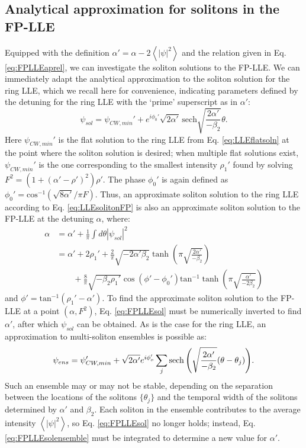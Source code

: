 \subsection{Analytical approximation for solitons in the FP-LLE}
Equipped with the definition $\alpha'=\alpha-2\left<|\psi|^2\right>$ and the relation given in Eq. \ref{eq:FPLLEaprel}, we can investigate the soliton solutions to the FP-LLE. We can immediately adapt the analytical approximation to the soliton solution for the ring LLE, which we recall here for convenience, indicating parameters defined by the detuning for the ring LLE with the `prime' superscript as in $\alpha'$:
\begin{equation}
\psi_{sol}=\psi_{CW,min}'+e^{i\phi_0'}\sqrt{2\alpha'}\,\mathrm{sech}\sqrt{\frac{2\alpha'}{-\beta_2}}\theta. \label{eq:LLEsolitonFP}
\end{equation}
Here $\psi_{CW,min}'$ is the flat solution to the ring LLE from Eq. \ref{eq:LLEflatsoln} at the point where the soliton solution is desired; when multiple flat solutions exist, $\psi_{CW,min}'$ is the one corresponding to the smallest intensity $\rho_1'$ found by solving $F^2=(1+(\alpha'-\rho')^2)\rho'$. The phase $\phi_0'$ is again defined as $\phi_0'=\mathrm{cos}^{-1}(\sqrt{8\alpha'}/\pi F)$. Thus, an approximate soliton solution to the ring LLE according to Eq. \ref{eq:LLEsolitonFP} is also an approximate soliton solution to the FP-LLE at the detuning $\alpha$, where:
\begin{align}
\alpha&=\alpha'+\frac{1}{\pi}\int d\theta |\psi_{sol}|^2\\
&=\alpha'+2\rho_1'+\frac{2}{\pi}\sqrt{-2\alpha'\beta_2}\tanh{\left(\pi\sqrt{\frac{2\alpha'}{-\beta_2}}\right)}\label{eq:FPLLEsol}\\
&\quad\quad +\frac{8}{\pi}\sqrt{-\beta_2 \rho_1'}\cos(\phi'-\phi_0')\mathrm{tan}^{-1}\tanh{\left(\pi\sqrt{\frac{\alpha'}{-2\beta_2}}\right)}\nonumber
\end{align}
and $\phi'=\mathrm{tan}^{-1}(\rho_1'-\alpha')$. To find the approximate soliton solution to the FP-LLE at a point $(\alpha,F^2)$, Eq. \ref{eq:FPLLEsol} must be numerically inverted to find $\alpha'$, after which $\psi_{sol}$ can be obtained. As is the case for the ring LLE, an approximation to multi-soliton ensembles is possible as:
\begin{equation}
\psi_{ens}=\psi_{CW,min}'+\sqrt{2\alpha^\prime}e^{i\phi_o^\prime}\sum_{j}\operatorname{sech}{\left(\sqrt{\frac{2\alpha^\prime}{-\beta_2}}(\theta-\theta_j)\right)}.\label{eq:FPLLEsolensemble}
\end{equation}
Such an ensemble may or may not be stable, depending on the separation between the locations of the solitons $\{\theta_j\}$ and the temporal width of the solitons determined by $\alpha'$ and $\beta_2$. Each soliton in the ensemble contributes to the average intensity $\left<|\psi|^2\right>$, so Eq. \ref{eq:FPLLEsol} no longer holds; instead, Eq. \ref{eq:FPLLEsolensemble} must be integrated to determine a new value for $\alpha'$. 

